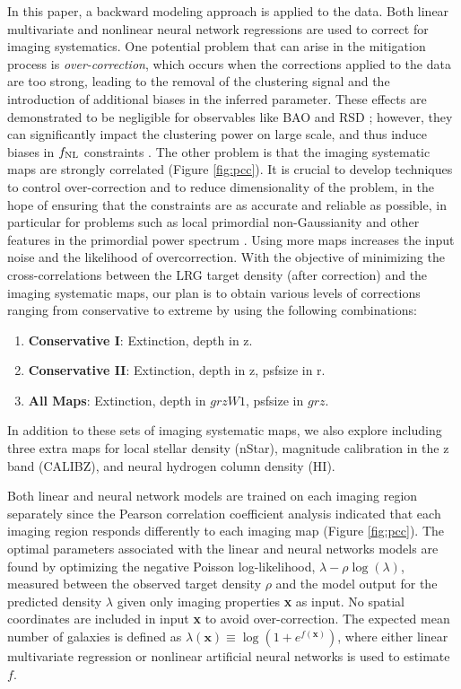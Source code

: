 In this paper, a backward modeling approach is applied to the data. Both linear multivariate and nonlinear neural network regressions are used to correct for imaging systematics. One potential problem that can arise in the mitigation process is \textit{over-correction}, which occurs when the corrections applied to the data are too strong, leading to the removal of the clustering signal and the introduction of additional biases in the inferred parameter. These effects are demonstrated to be negligible for observables like BAO and RSD \citep{merz2021clustering}; however, they can significantly impact the clustering power on large scale, and thus induce biases in $f_{\rm NL}$ constraints \citep{mueller2022primordial, rezaie2021primordial}. The other problem is that the imaging systematic maps are strongly correlated (Figure \ref{fig:pcc}). It is crucial to develop techniques to control over-correction and to reduce dimensionality of the problem, in the hope of ensuring that the constraints are as accurate and reliable as possible, in particular for problems such as local primordial non-Gaussianity and other features in the primordial power spectrum \citep{beutler2019primordial}. Using more maps increases the input noise and the likelihood of overcorrection. With the objective of minimizing the cross-correlations between the LRG target density (after correction) and the imaging systematic maps, our plan is to obtain various levels of corrections ranging from conservative to extreme by using the following combinations:
\begin{enumerate}[itemindent=*]
\item \textbf{Conservative I}: Extinction, depth in z.
\item \textbf{Conservative II}: Extinction, depth in z, psfsize in r.
\item \textbf{All Maps}: Extinction, depth in $grzW1$, psfsize in $grz$.
\end{enumerate}
In addition to these sets of imaging systematic maps, we also explore including three extra maps for local stellar density (nStar), magnitude calibration in the z band (CALIBZ), and neural hydrogen column density (HI). 

Both linear and neural network models are trained on each imaging region separately since the Pearson correlation coefficient analysis indicated that each imaging region responds differently to each imaging map (Figure \ref{fig:pcc}). The optimal parameters associated with the linear and neural networks models are found by optimizing the negative Poisson log-likelihood, $\lambda - \rho \log(\lambda)$, measured between the observed target density $\rho$ and the model output for the predicted density $\lambda$ given only imaging properties \textbf{x} as input. No spatial coordinates are included in input \textbf{x} to avoid over-correction. The expected mean number of galaxies is defined as $\lambda(\textbf{x}) \equiv \log (1+e^{f(\textbf{x})})$, where either linear multivariate regression or nonlinear artificial neural networks is used to estimate $f$. 

